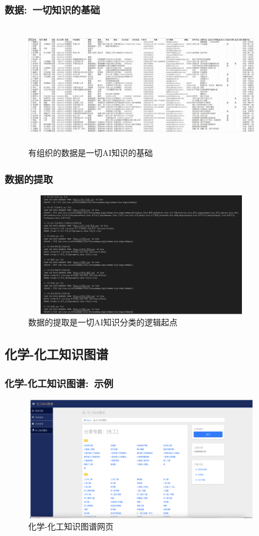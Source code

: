 \begin{frame}
	\frametitle{数据:~一切知识的基础}
\begin{figure}[h!]
\centering
\vskip -8pt
\includegraphics[height=2.10in,width=4.00in,viewport=0 0 360 160,clip]{Figures/KG_Chem-Info.png}
\caption{\tiny 有组织的数据是一切\textrm{AI}知识的基础}%
\label{Fig:KG_Chem-Enflurane}
\end{figure}
\end{frame}

\begin{frame}
	\frametitle{数据的提取}
\begin{figure}[h!]
\centering
\includegraphics[height=2.10in,width=4.00in,viewport=0 0 240 130,clip]{Figures/KG_Chem-extract.png}
\caption{\tiny 数据的提取是一切\textrm{AI}知识分类的逻辑起点}%
\label{Fig:KG_Chem-Extract}
\end{figure}
\end{frame}

\subsection{化学-化工知识图谱}
\begin{frame}
	\frametitle{化学-化工知识图谱:~示例}
\begin{figure}[h!]
\centering
\includegraphics[height=2.10in,width=4.00in,viewport=0 0 240 130,clip]{Figures/KG_Chem-html.png}
\caption{\tiny 化学-化工知识图谱网页}%
\label{Fig:KG_Chem-Enflurane}
\end{figure}
\end{frame}

